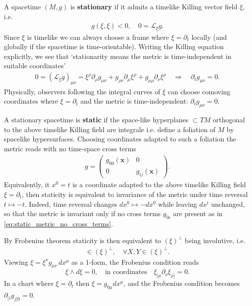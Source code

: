 \begin{mytheorem}
%
A spacetime $(M,g)$ is \textbf{stationary} if it admits a timelike Killing vector field $\xi$, i.e.
\begin{align}
    g(\xi,\xi) < 0, \quad 0= \mathcal{L}_\xi g.
\end{align}
%
Since $\xi$ is timelike we can always choose a frame where $\xi=\partial_t$ locally (and globally if the spacetime is time-orientable).
Writing the Killing equation explicitly, we see that `stationarity means the metric is time-independent in suitable coordinates'
\begin{align}
    0=\left(\mathcal{L}_\xi g\right)_{\mu\nu} = \xi^\rho \partial_\rho g_{\mu\nu} + g_{\rho\nu} \partial_\mu \xi^\rho + g_{\mu\rho} \partial_\nu \xi^\rho \quad \Rightarrow \quad \partial_t g_{\mu\nu} = 0.
\end{align}
%
Physically, observers following the integral curves of $\xi$ can choose comoving coordinates where $\xi=\partial_t$ and the metric is time-independent: $\partial_t g_{\mu\nu}=0$.

A stationary spacetime is \textbf{static} if the space-like hyperplanes $\subset T M$ orthogonal to the above timelike Killing field are integrale i.e. define a foliation of $M$ by spacelike hypersurfaces.
Choosing coordinates adapted to such a foliation the metric reads with no time-space cross terms
\begin{align}\label{eq:static_metric_no_cross_terms}
    g = \begin{pmatrix}
    g_{00}(\mathbf{x}) & 0 \\
    0 & g_{ij}(\mathbf{x})
    \end{pmatrix}.
\end{align}
%
Equivalently, it $x^0=t$ is a coordinate adapted to the above timelike Killing field $\xi=\partial_t$, then staticity is equivalent to invariance of the metric under time reversal $t\mapsto -t$.
Indeed, time reversal changes $dx^0 \mapsto -dx^0$ while leaving $dx^i$ unchanged, so that the metric is invariant only if no cross terms $g_{0i}$ are present as in \eqref{eq:static_metric_no_cross_terms}.

By Frobenius theorem staticity is then equivalent to $(\xi)^\perp$ being involutive, i.e.
\begin{align}
   [X,Y]\in \left(\xi\right)^\perp, \quad \forall X,Y \in \left(\xi\right)^\perp.
\end{align}
Viewing $\xi=\xi^\nu g_{\mu\nu}\, dx^\mu$ as a 1-form, the Frobenius condition reads              
\begin{equation}
    \xi \wedge d\xi = 0, \quad \text{in coordinates} \quad \xi_{[\mu} \partial_\nu \xi_{\rho]} = 0.
\end{equation}
In a chart where $\xi=\partial_t$ then $\xi = g_{0 \mu}dx^\mu$, and the Frobenius condition becomes $\partial_{[i} g_{j]0}=0$.


\end{mytheorem}
